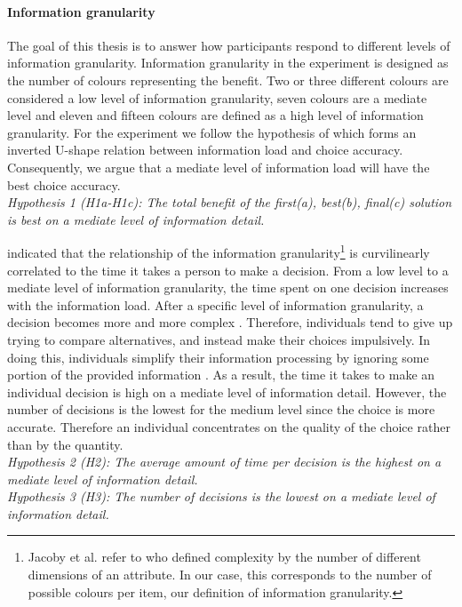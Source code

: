 \paragraph{Information granularity}
The goal of this thesis is to answer how participants respond to different levels of information granularity.
Information granularity in the experiment is designed as the number of colours representing the benefit. Two or three different colours are considered a low level of information granularity, seven colours are a mediate level and eleven and fifteen colours are defined as a high level of information granularity.
For the experiment we follow the hypothesis of \cite{Jacoby1974} which forms an inverted U-shape relation between information load and choice accuracy. Consequently, we argue that a mediate level of information load will have the best choice accuracy.\\
\textit{Hypothesis 1 (H1a-H1c): The total benefit of the first(a), best(b), final(c) solution is best on a mediate level of information detail.}

\cite{Jacoby1974} indicated that the relationship of the information granularity\footnote{Jacoby et al. refer to \cite{Hendrick1968} who defined complexity by the number of different dimensions of an attribute. In our case, this corresponds to the number of possible colours per item, our definition of information granularity. }  is curvilinearly correlated to the time it takes a person to make a decision. From a low level to a mediate level of information granularity, the time spent on one decision increases with the information load. After a specific level of information granularity, a decision becomes more and more complex \citep{Hendrick1968}. Therefore, individuals tend to give up trying to compare alternatives, and instead make their choices impulsively. In doing this, individuals simplify their information processing by ignoring some portion of the provided information \citep{Malhotra1982}.
As a result, the time it takes to make an individual decision is high on a mediate level of information detail. However, the number of decisions is the lowest for the medium level since the choice is more accurate. Therefore an individual concentrates on the quality of the choice rather than by the quantity.\\ 
\textit{Hypothesis 2 (H2): The average amount of time per decision is the highest on a mediate level of information detail.}\\
\textit{Hypothesis 3 (H3): The number of decisions is the lowest on a mediate level of information detail.}\\

